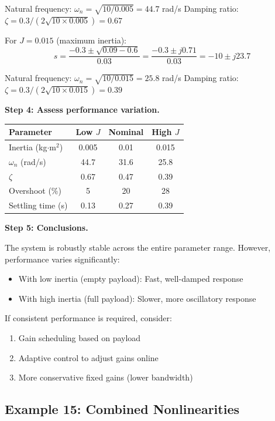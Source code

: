 \begin{example}
Natural frequency: $\omega_n = \sqrt{10/0.005} = 44.7$ rad/s
Damping ratio: $\zeta = 0.3/(2\sqrt{10 \times 0.005}) = 0.67$

For $J = 0.015$ (maximum inertia):
\begin{equation}
s = \frac{-0.3 \pm \sqrt{0.09 - 0.6}}{0.03} = \frac{-0.3 \pm j0.71}{0.03} = -10 \pm j23.7
\end{equation}

Natural frequency: $\omega_n = \sqrt{10/0.015} = 25.8$ rad/s
Damping ratio: $\zeta = 0.3/(2\sqrt{10 \times 0.015}) = 0.39$

\textbf{Step 4: Assess performance variation.}

\begin{center}
\begin{tabular}{@{}lccc@{}}
\toprule
Parameter & Low $J$ & Nominal & High $J$ \\
\midrule
Inertia (kg$\cdot$m$^2$) & 0.005 & 0.01 & 0.015 \\
$\omega_n$ (rad/s) & 44.7 & 31.6 & 25.8 \\
$\zeta$ & 0.67 & 0.47 & 0.39 \\
Overshoot (\%) & 5 & 20 & 28 \\
Settling time (s) & 0.13 & 0.27 & 0.39 \\
\bottomrule
\end{tabular}
\end{center}

\textbf{Step 5: Conclusions.}

The system is robustly stable across the entire parameter range. However, performance varies significantly:
\begin{itemize}
    \item With low inertia (empty payload): Fast, well-damped response
    \item With high inertia (full payload): Slower, more oscillatory response
\end{itemize}

If consistent performance is required, consider:
\begin{enumerate}
    \item Gain scheduling based on payload
    \item Adaptive control to adjust gains online
    \item More conservative fixed gains (lower bandwidth)
\end{enumerate}
\end{example}

\subsection{Example 15: Combined Nonlinearities}


